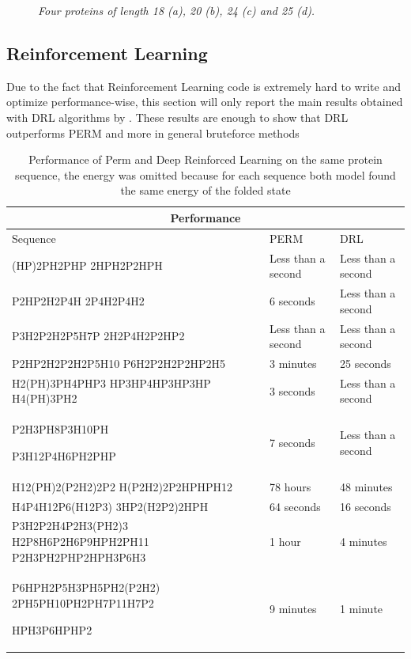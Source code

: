 \begin{figure}[H]
    \caption{\emph{Four proteins of length 18 (a), 20 (b), 24 (c) and 25 (d).}}
    \label{fig:cpsp}
\end{figure}


\subsection{Reinforcement Learning}

Due to the fact that Reinforcement Learning code is extremely hard to write and optimize performance-wise, this section will only report the main results obtained with DRL algorithms by \cite{jafari2020solving}. These results are enough to show that DRL outperforms PERM and more in general bruteforce methods

\FloatBarrier
\begin{table}[ht!]
\centering
\begin{tabular}[c]{ |p{6cm}||p{3cm}||p{3cm}|}
 \hline
 \multicolumn{3}{|c|}{Performance} \\
 \hline
 Sequence  & PERM & DRL\\
 \hline
(HP)2PH2PHP
2HPH2P2HPH & Less than a second & Less than a second\\
 \hline
P2HP2H2P4H
2P4H2P4H2 & 6 seconds  & Less than a second\\
 \hline
P3H2P2H2P5H7P
2H2P4H2P2HP2 & Less than a second & Less than a second\\
\hline
P2HP2H2P2H2P5H10
P6H2P2H2P2HP2H5 & 3 minutes & 25 seconds\\
\hline
H2(PH)3PH4PHP3
HP3HP4HP3HP3HP
H4(PH)3PH2 & 3 seconds & Less than a second\\
\hline
P2H3PH8P3H10PH

P3H12P4H6PH2PHP & 7 seconds & Less than a second\\
\hline 
H12(PH)2(P2H2)2P2
H(P2H2)2P2HPHPH12 & 78 hours & 48 minutes\\
\hline
H4P4H12P6(H12P3)
3HP2(H2P2)2HPH & 64 seconds & 16 seconds\\
\hline
P3H2P2H4P2H3(PH2)3
H2P8H6P2H6P9HPH2PH11
P2H3PH2PHP2HPH3P6H3 & 1 hour & 4 minutes\\
\hline
P6HPH2P5H3PH5PH2(P2H2)
2PH5PH10PH2PH7P11H7P2

HPH3P6HPHP2 & 9 minutes & 1 minute\\
\hline

\end{tabular}\\
\caption{Performance of Perm and Deep Reinforced Learning on the same protein sequence, the energy was omitted because for each sequence both model found the same energy of the folded state}
\end{table}

\FloatBarrier

